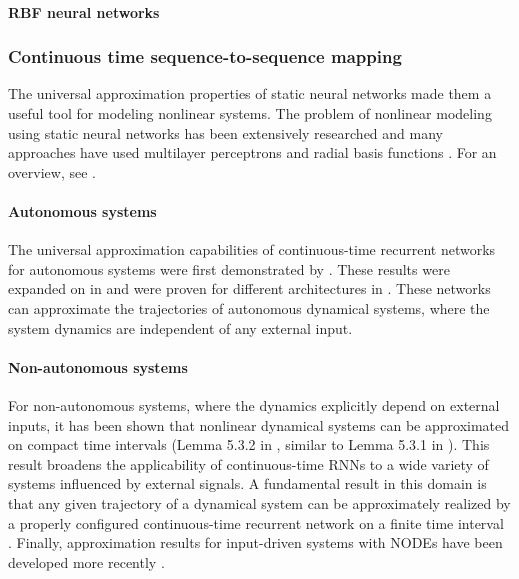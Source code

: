 \documentclass{article}
\theoremstyle{definition}
\theoremstyle{remark}
\newcounter{ct}
\begin{document}
\paragraph{RBF neural networks}
\citep{tan1995efficient}



\subsubsection{Continuous time sequence-to-sequence mapping}
The universal approximation properties of static neural networks \citep{funahashi1989approximate} made them a useful tool for modeling nonlinear systems. 
The problem of nonlinear modeling using static neural networks has been extensively researched \citep{narendra1990identification,warwick1992neural} and many approaches have used multilayer perceptrons and radial basis functions \citep{chen1992neural,choi1996constructive,tan1995efficient}. 
For an overview, see \citep{garces2012strategies}.



\paragraph{Autonomous systems}
The universal approximation capabilities of continuous-time recurrent networks for autonomous systems were first demonstrated by \citet{funahashi1993approximation}. 
These results were expanded on in \citep{kimura1998learning} and were proven for different architectures in \citep{chow2000modeling}.
These networks can approximate the trajectories of autonomous dynamical systems, where the system dynamics are independent of any external input.


\paragraph{Non-autonomous systems}
For non-autonomous systems, where the dynamics explicitly depend on external inputs, it has been shown that nonlinear dynamical systems can be approximated on compact time intervals (Lemma 5.3.2 in \citep{garces2012strategies}, similar to Lemma 5.3.1 in \citep{smale1974differential}).
This result broadens the applicability of continuous-time RNNs to a wide variety of systems influenced by external signals.
A fundamental result in this domain is that any given trajectory of a dynamical system can be approximately realized by a properly configured continuous-time recurrent network on a finite time interval \citep{nakamura2009approximation}.  %
Finally,  approximation results for input-driven systems with NODEs have been developed more recently \citep{ko2023homotopy, zakwan2023universal}.
	
\end{document}
